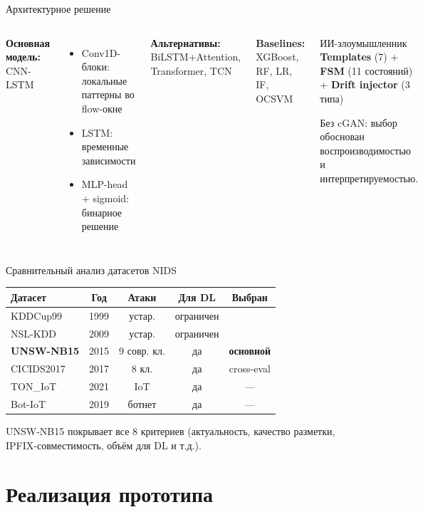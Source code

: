 \documentclass[14pt, aspectratio=169]{beamer}
\begin{document}
\begin{frame}{Архитектурное решение}
\begin{columns}[c]
\textbf{Основная модель:} CNN-LSTM
\begin{itemize}
    \item Conv1D-блоки: локальные паттерны во flow-окне
    \item LSTM: временные зависимости
    \item MLP-head + sigmoid: бинарное решение
\end{itemize}

\textbf{Альтернативы:} BiLSTM+Attention, Transformer, TCN

\textbf{Baselines:} XGBoost, RF, LR, IF, OCSVM

\begin{block}{ИИ-злоумышленник}
\textbf{Templates} (7) + \textbf{FSM} (11 состояний) +
\textbf{Drift injector} (3 типа)

Без cGAN: выбор обоснован воспроизводимостью и
интерпретируемостью.
\end{block}
\end{columns}
\end{frame}

\begin{frame}{Сравнительный анализ датасетов NIDS}
\centering
\small
\begin{tabular}{lcccc}
\toprule
\textbf{Датасет} & \textbf{Год} & \textbf{Атаки} & \textbf{Для DL} & \textbf{Выбран} \\
\midrule
KDDCup99 & 1999 & устар. & ограничен & \\
NSL-KDD  & 2009 & устар. & ограничен & \\
\textbf{UNSW-NB15}  & 2015 & 9 совр. кл. & да & \textbf{основной} \\
CICIDS2017 & 2017 & 8 кл. & да & cross-eval \\
TON\_IoT & 2021 & IoT & да & --- \\
Bot-IoT & 2019 & ботнет & да & --- \\
\bottomrule
\end{tabular}

\vspace{0.4cm}
\small UNSW-NB15 покрывает все 8 критериев (актуальность,
качество разметки, IPFIX-совместимость, объём для DL и т.д.).
\end{frame}

\section{Реализация прототипа}
\end{document}
